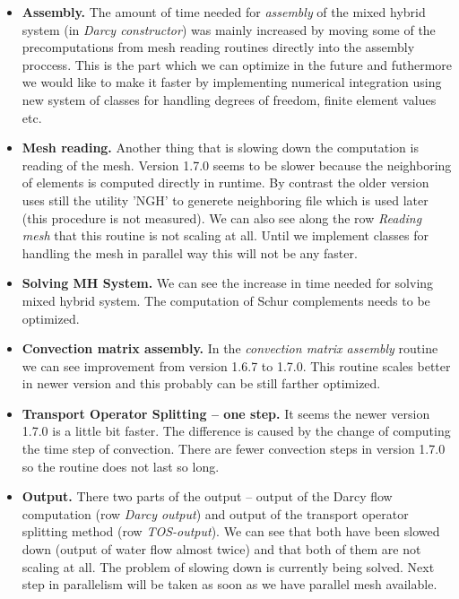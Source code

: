 \begin{itemize}
\item \textbf{Assembly.} The amount of time needed for \emph{assembly} of the mixed hybrid system (in \emph{Darcy constructor}) 
was mainly increased by moving some of the precomputations from mesh reading routines directly into the assembly proccess. 
This is the part which we can optimize in the future and futhermore we would like to make it faster by implementing numerical 
integration using new system of classes for handling degrees of freedom, finite element values etc.

\item \textbf{Mesh reading.} Another thing that is slowing down the computation is reading of the mesh. Version 1.7.0 seems 
to be slower because the neighboring of elements is computed directly in runtime. By contrast the older version uses still 
the utility 'NGH' to generete neighboring file which is used later (this procedure is not measured). We can also see along the 
row \emph{Reading mesh} that this routine is not scaling at all. Until we implement classes for handling the mesh in parallel 
way this will not be any faster.

\item \textbf{Solving MH System.} We can see the increase in time needed for solving mixed hybrid system. The computation 
of Schur complements needs to be optimized.

\item \textbf{Convection matrix assembly.}
In the \emph{convection matrix assembly} routine we can see improvement from version 1.6.7 to 1.7.0. This routine scales better in
newer version and this probably can be still farther optimized.

\item \textbf{Transport Operator Splitting -- one step.}
It seems the newer version 1.7.0 is a little bit faster. The difference is caused by the change of computing the time step of convection. 
There are fewer convection steps in version 1.7.0 so the routine does not last so long.

\item \textbf{Output.} There two parts of the output -- output of the Darcy flow computation (row \emph{Darcy output}) and 
output of the transport operator splitting method (row \emph{TOS-output}). We can see that both have been slowed down 
(output of water flow almost twice) and that both of them are not scaling at all. The problem of
slowing down is currently being solved. Next step in parallelism will be taken as soon as we have parallel mesh available.

\end{itemize}



